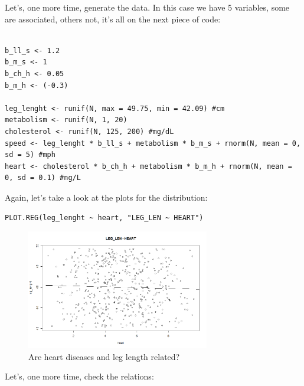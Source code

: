 \documentclass{article}
\begin{document}
Let's, one more time, generate the data. In this case we have 5 variables, some are associated, others not, it's all on the next piece of code:\par

\begin{lstlisting}

b_ll_s <- 1.2
b_m_s <- 1
b_ch_h <- 0.05
b_m_h <- (-0.3)

leg_lenght <- runif(N, max = 49.75, min = 42.09) #cm
metabolism <- runif(N, 1, 20) 
cholesterol <- runif(N, 125, 200) #mg/dL
speed <- leg_lenght * b_ll_s + metabolism * b_m_s + rnorm(N, mean = 0, sd = 5) #mph
heart <- cholesterol * b_ch_h + metabolism * b_m_h + rnorm(N, mean = 0, sd = 0.1) #ng/L

\end{lstlisting}

Again, let's take a look at the plots for the distribution:\par

\begin{lstlisting}
PLOT.REG(leg_lenght ~ heart, "LEG_LEN ~ HEART")
\end{lstlisting}
\begin{figure}[h]
\caption{Are heart diseases and leg length related?}
\includegraphics[width=8cm]{PLOT_RUNNER.png}
\centering
\end{figure}

Let's, one more time, check the relations:
\end{document}
